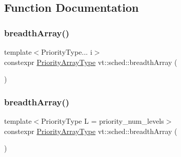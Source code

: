 \subsection{Function Documentation}
\mbox{\label{namespacevt_1_1sched_a4a522d8f67561a0ae0446769584c2deb}} 
\subsubsection{\texorpdfstring{breadth\+Array()}{breadthArray()}\hspace{0.1cm}{\footnotesize\ttfamily [1/2]}}
{\footnotesize\ttfamily template$<$Priority\+Type... i$>$ \\
constexpr \hyperlink{namespacevt_1_1sched_a2dbd1daff26f79efbff3f418ad9b2a8b}{Priority\+Array\+Type} vt\+::sched\+::breadth\+Array (\begin{DoxyParamCaption}\item[{std\+::integer\+\_\+sequence$<$ \hyperlink{namespacevt_a86bff9f556eb761b27fc8600d006ac04}{Priority\+Type}, i... $>$}]{ }\end{DoxyParamCaption})}

\mbox{\label{namespacevt_1_1sched_ac82001576ed1c9cee962ed07113cebe7}} 
\subsubsection{\texorpdfstring{breadth\+Array()}{breadthArray()}\hspace{0.1cm}{\footnotesize\ttfamily [2/2]}}
{\footnotesize\ttfamily template$<$Priority\+Type L = priority\+\_\+num\+\_\+levels$>$ \\
constexpr \hyperlink{namespacevt_1_1sched_a2dbd1daff26f79efbff3f418ad9b2a8b}{Priority\+Array\+Type} vt\+::sched\+::breadth\+Array (\begin{DoxyParamCaption}{ }\end{DoxyParamCaption})}

\mbox{\label{namespacevt_1_1sched_a05afd033ab9ecc1f0d1dc37b8b9b7827}} 
